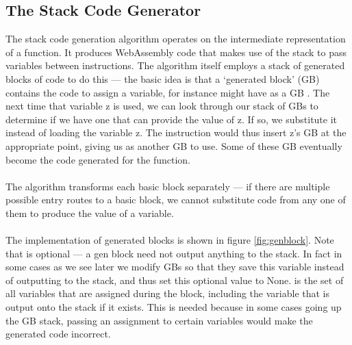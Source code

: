 \subsection{The Stack Code Generator}
%
The stack code generation algorithm operates on the intermediate representation of a function. It produces WebAssembly code that makes use of the stack to pass variables between instructions. The algorithm itself employs a stack of generated blocks of code to do this --- the basic idea is that a `generated block' (GB) contains the code to assign a variable, for instance  might have as a GB . The next time that variable z is used, we can look through our stack of GBs to determine if we have one that can provide the value of z. If so, we substitute it instead of loading the variable z. The instruction  would thus insert z's GB at the appropriate point, giving us  as another GB to use. Some of these GB eventually become the code generated for the function.
\\\\
The algorithm transforms each basic block separately --- if there are multiple possible entry routes to a basic block, we cannot substitute code from any one of them to produce the value of a variable. 
\\\\
The implementation of generated blocks is shown in figure \ref{fig:genblock}. Note that  is optional --- a gen block need not output anything to the stack. In fact in some cases as we see later we modify GBs so that they save this variable instead of outputting to the stack, and thus set this optional value to None.  is the set of all variables that are assigned during the block, including the variable that is output onto the stack if it exists. This is needed because in some cases going up the GB stack, passing an assignment to certain variables would make the generated code incorrect.

